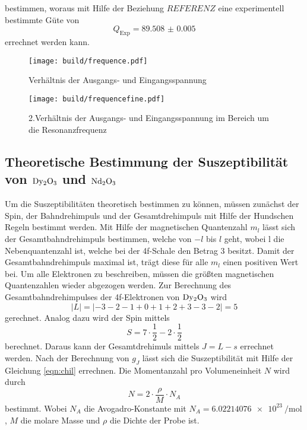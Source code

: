 bestimmen, woraus mit Hilfe der Beziehung $REFERENZ$ eine experimentell bestimmte Güte von 
\begin{equation*}
    Q_\text{Exp} = \num{89.508(5)}
\end{equation*}
errechnet werden kann.
\begin{figure}
    \centering
    \caption{Verhältnis der Ausgangs- und Eingangsspannung}
    \label{fig:frequence}
    \texttt{[image: build/frequence.pdf]}
\end{figure}
\begin{figure}
    \centering
    \caption{2.Verhältnis der Ausgangs- und Eingangsspannung im Bereich um die Resonanzfrequenz}
    \label{fig:frequencefine}
    \texttt{[image: build/frequencefine.pdf]}
\end{figure}
\FloatBarrier
\subsection{Theoretische Bestimmung der Suszeptibilität von $\ce{Dy2O3}$ und $\ce{Nd2O3}$}
Um die Suszeptibilitäten theoretisch bestimmen zu können, müssen zunächst der Spin, der Bahndrehimpuls und der Gesamtdrehimpuls mit Hilfe der Hundschen 
Regeln bestimmt werden.
Mit Hilfe der magnetischen Quantenzahl $m_l$ lässt sich der Gesamtbahndrehimpuls bestimmen, welche von $-l$ bis $l$ geht, wobei l die 
Nebenquantenzahl ist, welche bei der 4f-Schale den Betrag $3$ besitzt. 
Damit der Gesamtbahndrehimpuls maximal ist, trägt diese für alle $m_l$ einen positiven Wert bei. 
Um alle Elektronen zu beschreiben, müssen die größten magnetischen Quantenzahlen wieder abgezogen werden.
Zur Berechnung des Gesamtbahndrehimpulses der 4f-Elektronen von $\ce{Dy2O3}$ wird 
\begin{equation*}
    \lvert L \rvert = \lvert -3 - 2 - 1 + 0 + 1 + 2 + 3 - 3 - 2 \rvert = 5
\end{equation*} 
gerechnet. 
Analog dazu wird der Spin mittels
\begin{equation*}
    S = 7 \cdot \frac{1}{2} - 2  \cdot \frac{1}{2}
\end{equation*}
berechnet. Daraus kann der Gesamtdrehimuls mittels $J = L - s$ errechnet werden.
Nach der Berechnung von $g_J$ lässt sich die Suszeptibilität mit Hilfe der Gleichung \eqref{eqn:chil} errechnen.
Die Momentanzahl pro Volumeneinheit $N$ wird durch
\begin{equation}
    N = 2\cdot\frac{\rho}{M}\cdot N_A 
\end{equation}
bestimmt.
Wobei $N_A$ die Avogadro-Konstante mit $N_A = \SI{6.02214076e23}{\per\mole}$, $M$ die molare Masse und $\rho$ die Dichte der Probe ist. 
